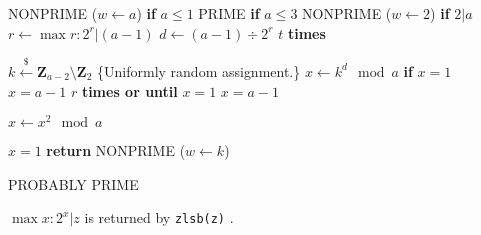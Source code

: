 \vspace{1em}
\hspace{-2.8ex}
\begin{minipage}{\linewidth}
\begin{algorithmic}
    \RETURN NONPRIME ($w \gets a$) {\bf if} {$a \le 1$}
    \RETURN PRIME {\bf if} {$a \le 3$}
    \RETURN NONPRIME ($w \gets 2$) {\bf if} {$2 \vert a$}
    \STATE $r \gets \max r : 2^r \vert (a - 1)$
    \STATE $d \gets (a - 1) \div 2^r$
     $t$ {\bf times}
    
    \hspace{2ex}
    \begin{minipage}{\linewidth}
        \STATE $k \xleftarrow{\$} \textbf{Z}_{a - 2} \setminus \textbf{Z}_{2}$ \textcolor{c}{\{Uniformly random assignment.\}}
        \STATE $x \gets k^d \mod a$
         {\bf if} $x = 1$ \OR $x = a - 1$
         $r$ {\bf times or until} $x = 1$ \OR $x = a - 1$

        \hspace{2ex}
        \begin{minipage}{\linewidth}
            \vspace{-1ex}
            \STATE $x \gets x^2 \mod a$
        \end{minipage}
        \vspace{-1.5em}
         $x = 1$ {\bf return} NONPRIME ($w \gets k$)
    \end{minipage}
    \vspace{-0.8ex}
    \RETURN PROBABLY PRIME
\end{algorithmic}
\end{minipage}
\vspace{1em}

\noindent
$\max x : 2^x \vert z$ is returned by {\tt zlsb(z)}
.
